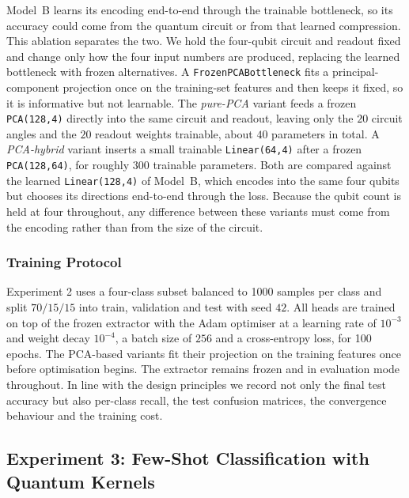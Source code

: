 Model~B learns its encoding end-to-end through the trainable bottleneck, so its accuracy
could come from the quantum circuit or from that learned compression. This ablation
separates the two. We hold the four-qubit circuit and readout fixed and change only how
the four input numbers are produced, replacing the learned bottleneck with frozen
alternatives.
A \texttt{FrozenPCABottleneck} fits a principal-component projection once on the
training-set features and then keeps it fixed, so it is informative but not learnable.
The \emph{pure-PCA} variant feeds a frozen \texttt{PCA(128,4)} directly into the same
circuit and readout, leaving only the $20$ circuit angles and the $20$ readout weights
trainable, about $40$ parameters in total. A \emph{PCA-hybrid} variant inserts a small
trainable \texttt{Linear(64,4)} after a frozen \texttt{PCA(128,64)}, for roughly $300$
trainable parameters. Both are compared against the learned \texttt{Linear(128,4)} of
Model~B, which encodes into the same four qubits but chooses its directions
end-to-end through the loss. Because the qubit count is held at four throughout, any
difference between these variants must come from the encoding rather than from the
size of the circuit.

\subsubsection{Training Protocol}
\label{sec:training}

Experiment 2 uses a four-class subset balanced to 1000 samples per class and split
$70/15/15$ into train, validation and test with seed $42$. All heads are trained on
top of the frozen extractor with the Adam optimiser at a learning rate of $10^{-3}$
and weight decay $10^{-4}$, a batch size of $256$ and a cross-entropy loss, for 100
epochs. The PCA-based variants fit their projection on the training features once
before optimisation begins. The extractor remains frozen and in evaluation mode
throughout. In line with the design principles we record not only the final test
accuracy but also per-class recall, the test confusion matrices, the convergence
behaviour and the training cost.



\subsection{Experiment 3: Few-Shot Classification with Quantum Kernels}
\label{sec:exp3_methods}

